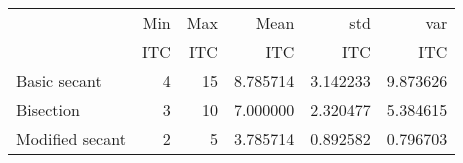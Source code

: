 \begin{tabular}{lrrrrr}
\toprule
{} &              Min &              Max &              Mean &               std &               var \\
{} & ITC & ITC & ITC & ITC & ITC \\
\midrule
Basic secant    &                 4 &                15 &          8.785714 &          3.142233 &          9.873626 \\
Bisection       &                 3 &                10 &          7.000000 &          2.320477 &          5.384615 \\
Modified secant &                 2 &                 5 &          3.785714 &          0.892582 &          0.796703 \\
\bottomrule
\end{tabular}
